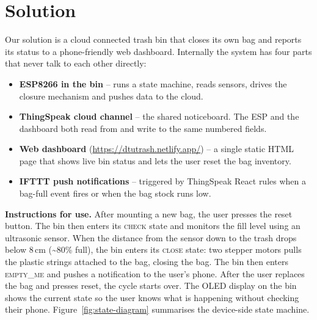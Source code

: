 \documentclass{article}
\begin{document}
\fi

\section{Solution}
\label{sec:solution}

Our solution is a cloud connected trash bin that closes its own bag and reports its status to a phone-friendly web dashboard. Internally the system has four parts that never talk to each other directly:

\begin{itemize}
    \item \textbf{ESP8266 in the bin} -- runs a state machine, reads sensors, drives the closure mechanism and pushes data to the cloud.
    \item \textbf{ThingSpeak cloud channel} -- the shared noticeboard. The ESP and the dashboard both read from and write to the same numbered fields.
    \item \textbf{Web dashboard} (\url{https://dtutrash.netlify.app/}) -- a single static HTML page that shows live bin status and lets the user reset the bag inventory.
    \item \textbf{IFTTT push notifications} -- triggered by ThingSpeak React rules when a bag-full event fires or when the bag stock runs low.
\end{itemize}
\noindent
\textbf{Instructions for use.} After mounting a new bag, the user presses the reset button. The bin then enters its \textsc{check} state and monitors the fill level using an ultrasonic sensor. When the distance from the sensor down to the trash drops below 8\,cm (\textasciitilde 80\% full), the bin enters its \textsc{close} state: two stepper motors pulls the plastic strings attached to the bag, closing the bag. The bin then enters \textsc{empty\_me} and pushes a notification to the user's phone. After the user replaces the bag and presses reset, the cycle starts over. The OLED display on the bin shows the current state so the user knows what is happening without checking their phone.
\newpage
Figure~\ref{fig:state-diagram} summarises the device-side state machine.



\ifdefined\mainfile\else
\end{document}
